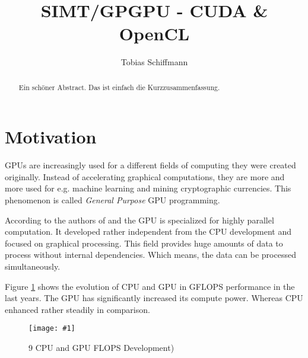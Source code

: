 \documentclass[a4paper,12pt]{llncs}
\numberwithin{equation}{section}
\newcommand{\bildbreite}[5]{
  \begin{figure}[htbp]
    \begin{center}
      \texttt{[image: \#1]}
      \caption[#5]{#4}
      \label{#3}
    \end{center}
  \end{figure}
}
\begin{document}


\author{Tobias Schiffmann}

\title{SIMT/GPGPU - CUDA \& OpenCL}

\maketitle

\thispagestyle{empty}

\begin{abstract}
Ein schöner Abstract. Das ist einfach die Kurzzusammenfassung.
\end{abstract}


\section{Motivation}
  GPUs are increasingly used for a different fields of computing they were created originally.
  Instead of accelerating graphical computations, they are more and more used for e.g. machine learning and mining cryptographic currencies.
  This phenomenon is called \textit{General Purpose} GPU programming.~\cite{8363085}~\cite{Huang.2008}
  
    According to the authors of \cite{NVIDIA.2019} and \cite{Rauber.2012} the GPU is specialized for highly parallel computation.
    It developed rather independent from the CPU development and focused on graphical processing.
    This field provides huge amounts of data to process without internal dependencies.
    Which means, the data can be processed simultaneously.
     
    Figure \ref{fig:GPU_CPU} shows the evolution of CPU and GPU in GFLOPS performance in the last years.
  The GPU has significantly increased its compute power.
  Whereas CPU enhanced rather steadily in comparison.
   \bildbreite{figures/GPU_CPU_Flops.JPG}{12cm}{fig:GPU_CPU}{9 CPU and GPU FLOPS Development)}{}
  
    
    
\end{document}
